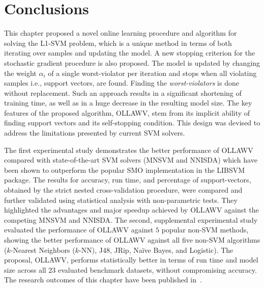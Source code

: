 \documentclass[reqno]{vcuthesis}
\numberwithin{equation}{chapter}
\begin{document}
\section{Conclusions}\label{sec:ollawvconclusion}
This chapter proposed a novel online learning procedure and algorithm for solving the L1-SVM problem, which is a unique method in terms of both iterating over samples and updating the model. A new stopping criterion for the stochastic gradient procedure is also proposed. The model is updated by changing the weight $\alpha_i$ of a single worst-violator per iteration and stops when all violating samples i.e., support vectors, are found. Finding the \textit{worst-violators} is done without replacement. Such an approach results in a significant shortening of training time, as well as in a huge decrease in the resulting model size. The key features of the proposed algorithm, OLLAWV, stem from its implicit ability of finding support vectors and its self-stopping condition. This design was devised to address the limitations presented by current SVM solvers. 

The first experimental study demonstrates the better performance of OLLAWV compared with state-of-the-art SVM solvers (MNSVM and NNISDA) which have been shown to outperform the popular SMO implementation in the LIBSVM package. The results for accuracy, run time, and percentage of support-vectors, obtained by the strict nested cross-validation procedure, were compared and further validated using statistical analysis with non-parametric tests. They highlighted the advantages and major speedup achieved by OLLAWV against the competing MNSVM and NNISDA. The second, supplemental experimental study evaluated the performance of OLLAWV against $5$ popular non-SVM methods, showing the better performance of OLLAWV against all five non-SVM algorithms ($k$-Nearest Neighbors ($k$-NN), J48, JRip, Na\"ive Bayes, and Logistic). The proposal, OLLAWV, performs statistically better in terms of run time and model size across all $23$ evaluated benchmark datasets, without compromising accuracy. The research outcomes of this chapter have been published in~\cite{melki2018ollawv}.
\end{document}
